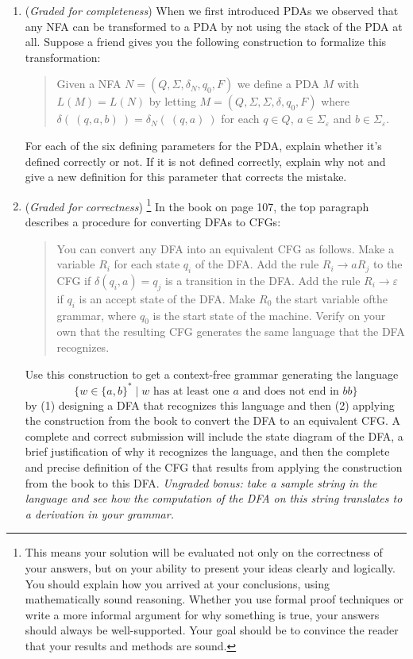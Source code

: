 \documentclass[12pt, oneside]{article}
\newcommand{\gradeCorrect}{({\it Graded for correctness}) }
\newcommand{\gradeCorrectFirst}{\gradeCorrect\footnote{This means your solution 
will be evaluated not only on the correctness of your answers, but on your ability
to present your ideas clearly and logically. You should explain how you 
arrived at your conclusions, using
mathematically sound reasoning. Whether you use formal proof techniques or 
write a more informal argument
for why something is true, your answers should always be well-supported. 
Your goal should be to convince the
reader that your results and methods are sound.} }
\newcommand{\gradeComplete}{({\it Graded for completeness}) }
\begin{document}
\begin{enumerate}[wide, labelwidth=!, labelindent=0pt]
\begin{enumerate}
\item\gradeComplete When we first introduced PDAs we observed 
that any NFA can be transformed to a PDA by not using the stack 
of the PDA at all. Suppose a friend gives you the following construction
to formalize this transformation:

\begin{quote}
Given a NFA $N = (Q, \Sigma, \delta_N, q_0, F)$ we define a PDA $M$
with $L(M) = L(N)$ by letting $M = ( Q, \Sigma, \Sigma, \delta, q_0, F)$ where 
$\delta(~(q,a,b)~) = \delta_N(~(q,a)~)$ for each $q \in Q$, 
$a \in \Sigma_{\varepsilon}$ and $b \in \Sigma_{\varepsilon}$.
\end{quote}

For each of the six defining parameters for the PDA, explain whether 
it's defined correctly or not. If it is not defined correctly, 
explain why not and give a new definition for this parameter that 
corrects the mistake.

\item\gradeCorrectFirst In the book on page 107, the top paragraph describes a procedure for converting DFAs to CFGs:
\begin{quote}
   You can convert any DFA into an equivalent CFG as follows. 
   Make a variable $R_i$ for each state $q_i$ of the DFA. Add the rule $R_i \to aR_j$ to the
   CFG if $\delta(q_i,a) =q_j$ is a transition in the DFA. Add the rule
   $R_i\to \varepsilon$ if $q_i$ is an accept state of the DFA. Make $R_0$ the start variable ofthe grammar, 
   where $q_0$ is the start state of the machine. Verify on your own that the resulting CFG 
   generates the same language that the DFA recognizes.
\end{quote}

Use this construction to get a context-free grammar generating the language 
\[
    \{ w \in \{a,b\}^* \mid w \text{ has at least one $a$ and does not end in  $bb$}\}
\]
by (1) designing a DFA that recognizes this language and then (2) applying the construction from the book to convert the 
DFA to an equivalent CFG. A complete and correct submission will include the state diagram of the DFA, a brief justification of why 
it recognizes the language, and then the complete and precise definition of the CFG that results from applying the construction 
from the book to this DFA. {\it Ungraded bonus: take a sample string in the language and see how the computation of 
the DFA on this string translates to a derivation in your grammar.}


\end{enumerate}
\end{enumerate}
\end{document}
